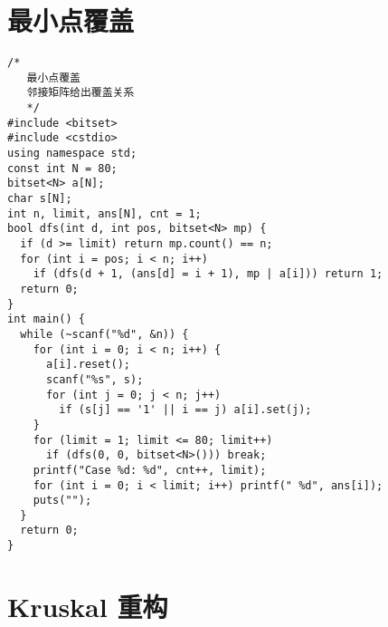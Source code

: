 \section{最小点覆盖}

\begin{lstlisting}
/*
   最小点覆盖
   邻接矩阵给出覆盖关系
   */
#include <bitset>
#include <cstdio>
using namespace std;
const int N = 80;
bitset<N> a[N];
char s[N];
int n, limit, ans[N], cnt = 1;
bool dfs(int d, int pos, bitset<N> mp) {
  if (d >= limit) return mp.count() == n;
  for (int i = pos; i < n; i++)
    if (dfs(d + 1, (ans[d] = i + 1), mp | a[i])) return 1;
  return 0;
}
int main() {
  while (~scanf("%d", &n)) {
    for (int i = 0; i < n; i++) {
      a[i].reset();
      scanf("%s", s);
      for (int j = 0; j < n; j++)
        if (s[j] == '1' || i == j) a[i].set(j);
    }
    for (limit = 1; limit <= 80; limit++)
      if (dfs(0, 0, bitset<N>())) break;
    printf("Case %d: %d", cnt++, limit);
    for (int i = 0; i < limit; i++) printf(" %d", ans[i]);
    puts("");
  }
  return 0;
}

\end{lstlisting}

\section{Kruskal 重构}

